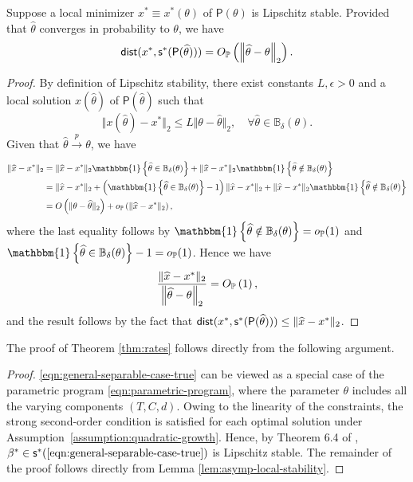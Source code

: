 \begin{lemma} \label{lem:asymp-local-stability}
Suppose a local minimizer $x^* \equiv x^*(\theta)$ of $\mathsf{P}({\theta})$ is Lipschitz stable. Provided that $\widehat{\theta}$ converges in probability to $\theta$, we have
\[
\textsf{dist}(x^*, \mathsf{s}^*(\mathsf{P}(\widehat{\theta}))) = O_{\mathbb{P}}\left(\left\Vert \widehat{\theta} - \theta \right\Vert_2\right).
\]
\end{lemma}
\begin{proof}

By definition of Lipschitz stability, there exist constants $L, \epsilon > 0$ and a local solution $x(\widehat{\theta})$ of $\mathsf{P}(\widehat{\theta})$ such that \[
\Vert x(\widehat{\theta}) - {x^*} \Vert_2 \leq L \Vert \theta - \widehat{\theta} \Vert_2, \quad \forall \widehat{\theta} \in \mathbb{B}_{\delta}({\theta}).
\]
Given that $\widehat{\theta} \xrightarrow[]{p} \theta$, we have 
\begin{align*}
\Vert \widehat{x} - {x^*} \Vert_2 &=   \Vert \widehat{x} - {x^*} \Vert_2\mathbbm{1}\left\{\widehat{\theta} \in \mathbb{B}_{\delta}(\theta)\right\} + \Vert \widehat{x} - {x^*} \Vert_2\mathbbm{1}\left\{\widehat{\theta} \notin \mathbb{B}_{\delta}(\theta)\right\}  \\
& = \Vert \widehat{x} - {x^*} \Vert_2 + \left(\mathbbm{1}\left\{\widehat{\theta} \in \mathbb{B}_{\delta}(\theta)\right\} - 1\right)\Vert \widehat{x} - {x^*} \Vert_2 + \Vert \widehat{x} - {x^*} \Vert_2\mathbbm{1}\left\{\widehat{\theta} \notin \mathbb{B}_{\delta}(\theta)\right\} \\
&= O\left( \Vert \theta - \widehat{\theta} \Vert_2 \right) + o_{\Pb}\left(\Vert \widehat{x} - {x^*} \Vert_2 \right),
\end{align*}
where the last equality follows by $\mathbbm{1}\left\{\widehat{\theta} \notin \mathbb{B}_{\delta}(\theta)\right\} = o_{\Pb}(1)$ and $\mathbbm{1}\left\{\widehat{\theta} \in \mathbb{B}_{\delta}(\theta)\right\} - 1 = o_{\Pb}(1)$. Hence we have
\[
\frac{\Vert\widehat{x} - x^* \Vert_2}{\left\Vert \widehat{\theta} - \theta \right\Vert_2} = O_{\mathbb{P}}\left(1\right),
\]
and the result follows by the fact that  $\textsf{dist}(x^*, \mathsf{s}^*(\mathsf{P}(\widehat{\theta}))) \leq \Vert \widehat{x} - x^* \Vert_2$.
\end{proof}

The proof of Theorem \ref{thm:rates} follows directly from the following argument.

\begin{proof}
\ref{eqn:general-separable-case-true} can be viewed as a special case of the parametric program \ref{eqn:parametric-program}, where the parameter $\theta$ includes all the varying components $(T,C,d)$.
Owing to the linearity of the constraints, the strong second-order condition \citep[Definition 6.1]{still2018lectures} is satisfied for each optimal solution under Assumption~\ref{assumption:quadratic-growth}. Hence, by Theorem 6.4 of \citet{still2018lectures}, $\beta^* \in \mathsf{s}^*(\text{\ref{eqn:general-separable-case-true}})$ is Lipschitz stable. The remainder of the proof follows directly from Lemma \ref{lem:asymp-local-stability}.
\end{proof}



